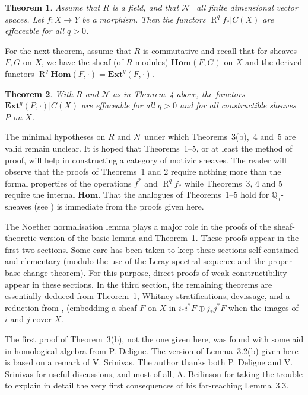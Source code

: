 \documentclass[10pt,twoside]{article}
\newtheorem{thm*}{Theorem}
\newcommand{\HHom}{{\mathbf{Hom}}}
\newcommand{\EExt}{{\mathbf{Ext}}}
\newcommand{\derived}{{\operatorname{R}}}
\begin{document}
\begin{thm*} Assume that $R$ is a field, and that
 $\mathcal{N}$=all finite dimensional vector spaces. 
 Let $f:X \to Y$ be a morphism. Then the functors
 $\derived ^qf_*|C(X)$ are effaceable for all $q>0$. 
\end{thm*}

For the next theorem, assume that $R$ is commutative and recall that
for sheaves $F,G$ on $X$, we have the sheaf   (of $R$-modules) 
$\HHom(F,G)$ on $X$ and the 
derived functors $\derived^q\HHom(F,\cdot)=\EExt^q(F,\cdot)$.

\begin{thm*} With $R$ and $\mathcal{N}$ 
 as in Theorem~4 above, the functors \linebreak $\EExt^q(P,\cdot)|C(X)$
 are effaceable for all $q>0$ and for all constructible
sheaves $P$ on $X$.   
\end{thm*}

The minimal hypotheses on $R$ and $\mathcal{N}$  under
which Theorems~3(b),~4 and~5 are valid remain unclear. 
It is hoped that Theorems~1--5, or at least the method of proof,
will help in constructing a category of motivic sheaves. The
reader will observe that the proofs of Theorems~1 and 2
 require nothing more than the formal properties
 of the operations $f^*$ and 
$\derived^ qf_*$ while Theorems~3, 4 and 5 require the internal
 $\HHom$. That the analogues of Theorems~1--5 hold
for  $\mathbb{Q\,}_l$- sheaves (see \cite[page~84]{nori:SGAfourhalf}) is 
immediate from the proofs given here. 

The Noether normalisation lemma plays a major role in the proofs
of the sheaf-theoretic version of the basic lemma and Theorem~1. These proofs 
appear in the first two sections.
Some care has been taken to keep these sections self-contained
and elementary (modulo the use of the Leray spectral sequence and the 
proper base change theorem). For this purpose, direct proofs
of weak constructibility appear in these sections.  
In the third section, the 
remaining theorems are essentially deduced from Theorem~1, 
Whitney stratifications, devissage, and a 
reduction from \cite{nori:SGA4}, \cite{nori:SGAfourhalf} 
(embedding a sheaf $F$ on $X$ in 
$i_*i^*F \oplus j_*j^*F$ when the images of $i$ and $j$ 
cover $X$.

The first proof of Theorem~3(b), not the one
given here, was found with some aid in homological algebra from
P. Deligne. The version of Lemma~3.2(b) given here is based on a
remark of V. Srinivas.    The author thanks both P. Deligne and V. Srinivas
for useful discussions, and most of all, A. Beilinson for 
taking the trouble to explain in detail the very first  
consequences of his far-reaching Lemma~3.3.
\end{document}
